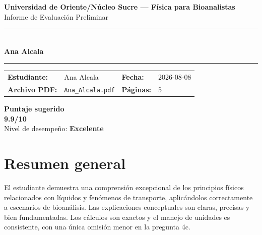 \documentclass[11pt,a4paper]{article}
\begin{document}
\begin{center}
  {\Large\bfseries\color{azulTitulo} Universidad de Oriente/Núcleo Sucre --- Física para Bioanalistas}\\[4pt]
  {\large Informe de Evaluación Preliminar}\\[12pt]
  \rule{\linewidth}{1.2pt}\\[6pt]
  {\LARGE\bfseries Ana Alcala}\\[4pt]
  \rule{\linewidth}{0.6pt}
\end{center}

\vspace{4pt}
\begin{tcolorbox}[cajaTitulo, title=Datos del informe]
\begin{tabular}{@{}llll@{}}
  \textbf{Estudiante:}  & Ana Alcala  &
  \textbf{Fecha:}       & 2026-08-08 \\[4pt]
  \textbf{Archivo PDF:} & \texttt{Ana\_Alcala.pdf}  &
  \textbf{Páginas:}     & 5 \\
\end{tabular}
\end{tcolorbox}

\vspace{6pt}
\begin{center}
  \begin{tcolorbox}[
    enhanced,
    colback=white, colframe=desempeno_excelente,
    width=0.62\linewidth,
    boxrule=2pt,
    halign=center, valign=center,
    top=8pt, bottom=8pt,
  ]
    \centering
    {\large\bfseries Puntaje sugerido}\\[6pt]
    {\Huge\bfseries\color{desempeno_excelente} 9.9/10}\\[6pt]
    {\large Nivel de desempeño: \textbf{\color{desempeno_excelente} Excelente}}
  \end{tcolorbox}
\end{center}

\section*{Resumen general}
El estudiante demuestra una comprensión excepcional de los principios físicos relacionados con líquidos y fenómenos de transporte, aplicándolos correctamente a escenarios de bioanálisis. Las explicaciones conceptuales son claras, precisas y bien fundamentadas. Los cálculos son exactos y el manejo de unidades es consistente, con una única omisión menor en la pregunta 4c.
\end{document}
